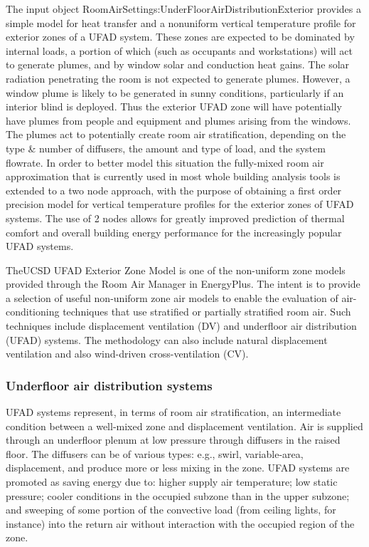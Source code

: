 {The input object RoomAirSettings:UnderFloorAirDistributionExterior provides a simple model for heat transfer and a nonuniform vertical temperature profile for exterior zones of a UFAD system. These zones are expected to be dominated by internal loads, a portion of which (such as occupants and workstations) will act to generate plumes, and by window solar and conduction heat gains. The solar radiation penetrating the room is not expected to generate plumes. However, a window plume is likely to be generated in sunny conditions, particularly if an interior blind is deployed. Thus the exterior UFAD zone will have potentially have plumes from people and equipment and plumes arising from the windows. The plumes act to potentially create room air stratification, depending on the type \& number of diffusers, the amount and type of load, and the system flowrate. In order to better model this situation the fully-mixed room air approximation that is currently used in most whole building analysis tools is extended to a two node approach, with the purpose of obtaining a first order precision model for vertical temperature profiles for the exterior zones of UFAD systems. The use of 2 nodes allows for greatly improved prediction of thermal comfort and overall building energy performance for the increasingly popular UFAD systems.

TheUCSD UFAD Exterior Zone Model is one of the non-uniform zone models provided through the Room Air Manager in EnergyPlus. The intent is to provide a selection of useful non-uniform zone air models to enable the evaluation of air-conditioning techniques that use stratified or partially stratified room air. Such techniques include displacement ventilation (DV) and underfloor air distribution (UFAD) systems. The methodology can also include natural displacement ventilation and also wind-driven cross-ventilation (CV).

\subsubsection{Underfloor air distribution systems}\label{underfloor-air-distribution-systems-1}

UFAD systems represent, in terms of room air stratification, an intermediate condition between a well-mixed zone and displacement ventilation. Air is supplied through an underfloor plenum at low pressure through diffusers in the raised floor. The diffusers can be of various types: e.g., swirl, variable-area, displacement, and produce more or less mixing in the zone. UFAD systems are promoted as saving energy due to: higher supply air temperature; low static pressure; cooler conditions in the occupied subzone than in the upper subzone; and sweeping of some portion of the convective load (from ceiling lights, for instance) into the return air without interaction with the occupied region of the zone.

}
